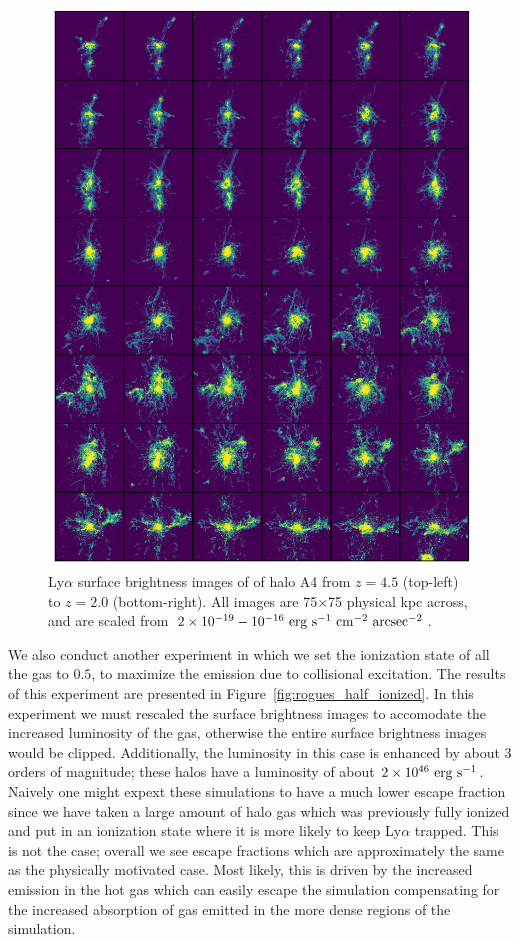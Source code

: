 \begin{figure}
    \centering
    \includegraphics[width=\textwidth,keepaspectratio]{figures/rogues_fully_ionized.png}
    \caption{
        Ly$\alpha$ surface brightness images of of halo A4 from $z=4.5$ (top-left) to $z=2.0$ (bottom-right).
        All images are 75$\times$75 physical kpc across, and are scaled from $2\times10^{-19}-10^{-16}\ \rm{erg}\ \rm{s}^{-1}\ \rm{cm}^{-2}\ \rm{arcsec}^{-2}$.
    }
  \label{fig:rogues_fully_ionized}
\end{figure}


We also conduct another experiment in which we set the ionization state of all the gas to $0.5$, to maximize the emission due to collisional excitation.
The results of this experiment are presented in Figure~\ref{fig:rogues_half_ionized}.
In this experiment we must rescaled the surface brightness images to accomodate the increased luminosity of the gas, otherwise the entire surface brightness images would be clipped.
Additionally, the luminosity in this case is enhanced by about 3 orders of magnitude; these halos have a luminosity of about $2\times10^{46}\ \rm{erg}\ \rm{s}^{-1}$.
Naively one might expext these simulations to have a much lower escape fraction since we have taken a large amount of halo gas which was previously fully ionized and put in an ionization state where it is more likely to keep Ly$\alpha$ trapped.
This is not the case; overall we see escape fractions which are approximately the same as the physically motivated case.
Most likely, this is driven by the increased emission in the hot gas which can easily escape the simulation compensating for the increased absorption of gas emitted in the more dense regions of the simulation.

